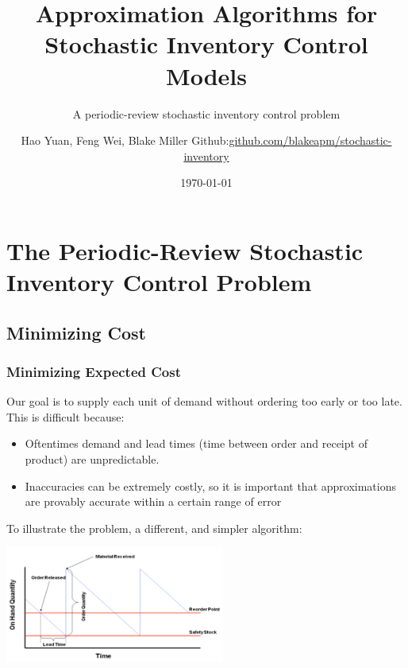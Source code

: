 \documentclass{beamer}
\title{Approximation Algorithms for Stochastic Inventory Control Models}
\subtitle{A periodic-review stochastic inventory control problem}
\author[Hao Yuan, Feng Wei, Blake Miller]{Hao Yuan, Feng Wei, Blake Miller  {\ttfamily Github:\href{https://github.com/blakeapm/stochastic-inventory}{github.com/blakeapm/stochastic-inventory}}}
\date{\today}
\begin{document}
  \frame{\titlepage}
  \section{The Periodic-Review Stochastic Inventory Control Problem}
  \subsection{Minimizing Cost}
  \begin{frame}
    \frametitle{Minimizing Expected Cost}
    Our goal is to supply each unit of demand without ordering too early or too late. This is difficult because:
    \begin{itemize}
      \item Oftentimes demand and lead times (time between order and receipt of product) are unpredictable.
      \item Inaccuracies can be extremely costly, so it is important that approximations are provably accurate within a certain range of error
    \end{itemize}
    To illustrate the problem, a different, and simpler algorithm:
      \begin{center}
      \includegraphics[height=1.5in]{purchasing.png}
      \end{center}
  \end{frame}
\end{document}
